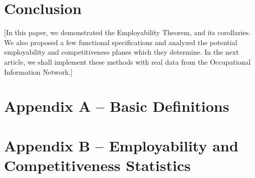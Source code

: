 \documentclass[hidelinks, nonatbib]{elsarticle}
\begin{document}

\section{Conclusion}
[In this paper, we demonstrated the Employability Theorem, and its corollaries. We also proposed a few functional specifications and analyzed the potential employability and competitiveness planes which they determine. In the next article, we shall implement these methods with real data from the Occupational Information Network.]


\newpage
\printbibliography[
    heading=bibintoc,
    title={References}
]


\newpage
\section*{Appendix A -- Basic Definitions}

\section*{Appendix B -- Employability and Competitiveness Statistics}

\end{document}
